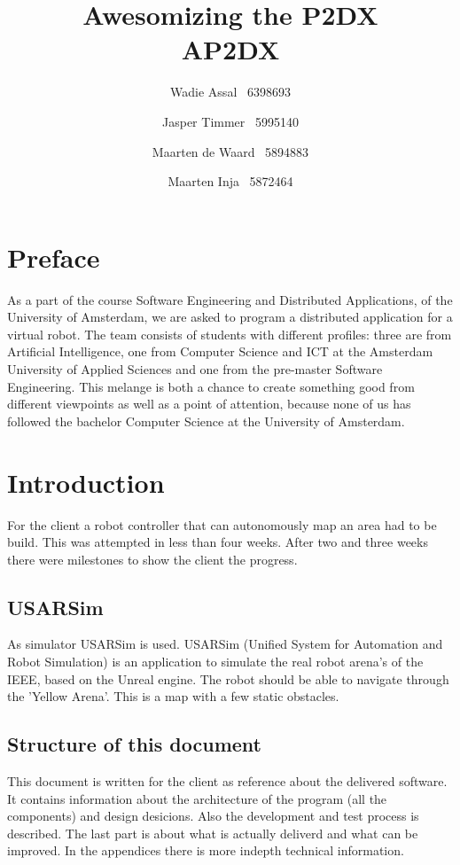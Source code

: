 \documentclass[titlepage, a4paper,10pt]{article}
\title{Awesomizing the P2DX\\\small AP2DX}
\author{Wadie Assal \ 6398693 \and Jasper Timmer \ 5995140 \and Maarten de Waard \ 5894883 \and  Maarten Inja \ 5872464}
\begin{document}
\maketitle

\tableofcontents
\newpage


\section{Preface}
As a part of the course Software Engineering and Distributed Applications, of
the University of Amsterdam, we are asked to program a distributed application
for a virtual robot. The team consists of students with different profiles:
three are from Artificial Intelligence, one from Computer Science and ICT at the
Amsterdam University of Applied Sciences and one from the pre-master Software
Engineering. This melange is both a chance to create something good from
different viewpoints as well as a point of attention, because none of us has
followed the bachelor Computer Science at the University of Amsterdam. 

\newpage

\section{Introduction}
For the client a robot controller that can autonomously map an area had to be build. This was attempted in less than four weeks. After two and three weeks there were milestones to show the client the progress.

\subsection{USARSim}
As simulator USARSim is used. USARSim (Unified System for Automation and Robot Simulation) is an application to simulate the real robot arena's of the IEEE, based on the Unreal engine. The robot should be able to navigate through the 'Yellow Arena'. This is a map with a few static obstacles.

\subsection{Structure of this document}
This document is written for the client as reference about the delivered software. It contains information about the architecture of the program (all the components) and design desicions. Also the development and test process is described. The last part is about what is actually deliverd and what can be improved. In the appendices there is more indepth technical information.
\end{document}
